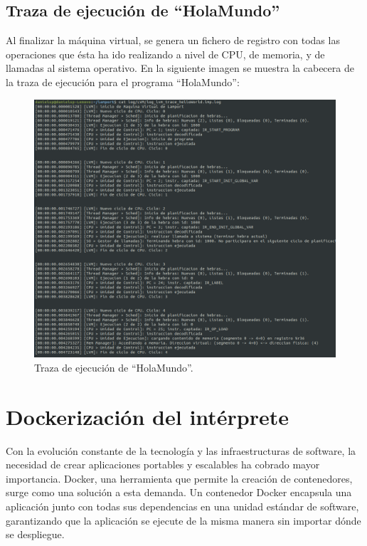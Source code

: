 \subsection{Traza de ejecución de ``HolaMundo''}
Al finalizar la máquina virtual, se genera un fichero de registro con todas las operaciones que ésta ha ido realizando a nivel de CPU, de memoria, y de llamadas al sistema operativo. En la siguiente imagen se muestra la cabecera de la traza de ejecución para el programa ``HolaMundo'':
\begin{figure}[h]
  \begin{minipage}{\linewidth}
    \centering
    \includegraphics[width=\linewidth]{images/implementacion/ejecucion/traza.png}
    \caption{Traza de ejecución de ``HolaMundo''.}
    \label{fig:trazaHolaMundo}
  \end{minipage}
\end{figure}

\newpage
\section{Dockerización del intérprete}
Con la evolución constante de la tecnología y las infraestructuras de software, la necesidad de crear aplicaciones portables y escalables ha cobrado mayor importancia. Docker, una herramienta que permite la creación de contenedores, surge como una solución a esta demanda. Un contenedor Docker encapsula una aplicación junto con todas sus dependencias en una unidad estándar de software, garantizando que la aplicación se ejecute de la misma manera sin importar dónde se despliegue. 



